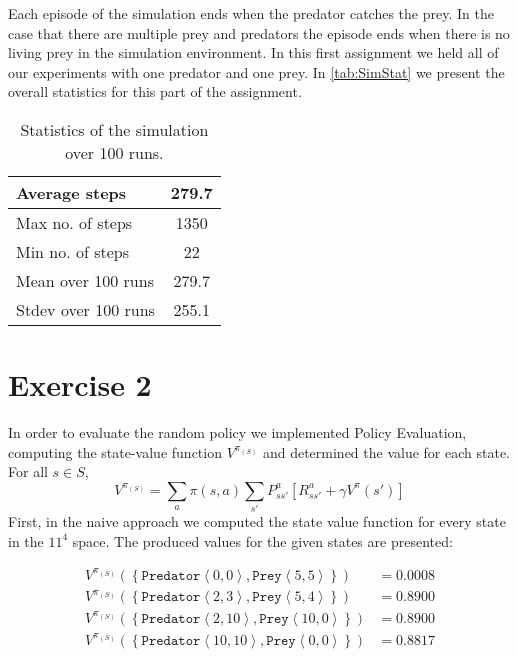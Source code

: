 \documentclass[a4paper,11pt]{article}
\newcommand{\Pred}[2]{\ensuremath{\mathtt{Predator}\left<#1, #2\right>}}
\newcommand{\Prey}[2]{\ensuremath{\mathtt{Prey}\left<#1, #2\right>}}
\begin{document}
Each episode of the simulation ends when the predator catches the prey.  In the case that there are multiple prey and predators the episode ends when there is no living prey in the simulation environment.  In this first assignment we held all of our experiments with one predator and one prey.  In \autoref{tab:SimStat} we present the overall statistics for this part of the assignment.

\begin{table}[h!]
\caption{Statistics of the simulation over 100 runs.}
\label{tab:SimStat}
\begin{center}
\begin{small}
\begin{tabular}{|@{ }l@{ }|@{ }c@{ }|}
    \hline
      Average steps & 279.7 \\ \hline
      Max no. of steps & 1350   \\ \hline
      Min no. of steps & 22 \\ \hline
      Mean over 100 runs & 279.7  \\ \hline
      Stdev over 100 runs & 255.1 \\
    \hline
    \end{tabular}      
\end{small}
\end{center}  
\end{table}

\section*{Exercise 2}
In order to evaluate the random policy we implemented Policy Evaluation, computing the state-value function $V^{\pi_{(S)}}$ and determined the value for each state. For all $s \in S$,
\[
V^{\pi_{(S)}} = \sum_{a}\pi(s,a)\sum_{s'}P_{ss'}^a[R_{ss'}^a + \gamma V^{\pi}(s')]
\]
First, in the naive approach we computed the state value function for every state in the $11^{4}$ space. The produced values for the given states are presented:

\begin{align*}
  V^{\pi_{(S)}}(\left\{\Pred{0}{0},\Prey{5}{5}\right\})   & = 0.0008 \\
    V^{\pi_{(S)}}(\left\{\Pred{2}{3},\Prey{5}{4}\right\})   &= 0.8900 \\
    V^{\pi_{(S)}}(\left\{\Pred{2}{10},\Prey{10}{0}\right\}) &= 0.8900 \\
    V^{\pi_{(S)}}(\left\{\Pred{10}{10},\Prey{0}{0}\right\}) &= 0.8817
\end{align*}
\end{document}
